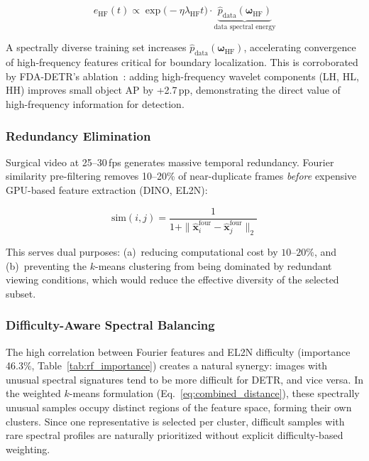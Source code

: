 \begin{equation}
    e_{\text{HF}}(t) \propto \exp\!\bigl(-\eta \lambda_{\text{HF}} t\bigr)
    \cdot \underbrace{\hat{p}_{\text{data}}(\boldsymbol{\omega}_{\text{HF}})}
          _{\text{data spectral energy}}
\end{equation}

A spectrally diverse training set increases
$\hat{p}_{\text{data}}(\boldsymbol{\omega}_{\text{HF}})$, accelerating
convergence of high-frequency features critical for boundary localization.
This is corroborated by FDA-DETR's ablation~\cite{fda_detr2025}: adding
high-frequency wavelet components (LH, HL, HH) improves small object AP by
+2.7\,pp, demonstrating the direct value of high-frequency information for
detection.

\subsubsection{Redundancy Elimination}

Surgical video at 25--30\,fps generates massive temporal redundancy.
Fourier similarity pre-filtering removes 10--20\% of near-duplicate frames
\emph{before} expensive GPU-based feature extraction (DINO, EL2N):

\begin{equation}
    \text{sim}(i,j) = \frac{1}{1 + \|\hat{\mathbf{x}}_i^{\text{four}}
                      - \hat{\mathbf{x}}_j^{\text{four}}\|_2}
\end{equation}

This serves dual purposes: (a)~reducing computational cost by $10$--$20\%$,
and (b)~preventing the $k$-means clustering from being dominated by
redundant viewing conditions, which would reduce the effective diversity of
the selected subset.

\subsubsection{Difficulty-Aware Spectral Balancing}

The high correlation between Fourier features and EL2N difficulty
(importance 46.3\%, Table~\ref{tab:rf_importance}) creates a natural
synergy: images with unusual spectral signatures tend to be more difficult
for DETR, and vice versa.  In the weighted $k$-means formulation
(Eq.~\ref{eq:combined_distance}), these spectrally unusual samples occupy
distinct regions of the feature space, forming their own clusters.  Since
one representative is selected per cluster, difficult samples with rare
spectral profiles are naturally prioritized without explicit difficulty-based
weighting.


